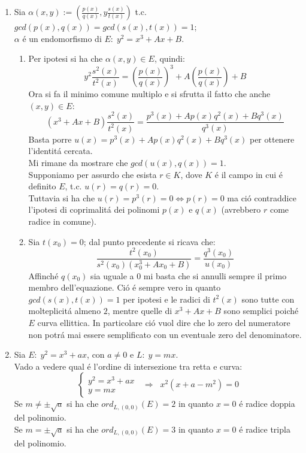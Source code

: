 \documentclass[a4paper]{article}
\newcommand{\sist}{\begin{cases}}
\newcommand{\esist}{\end{cases}}
\newcommand{\ds}{\displaystyle}
\begin{document}
\begin{enumerate}
\begin{enumerate}
\item Se $j(E)=0\;\Rightarrow\;a_2=0$ si ha che il cambiamento di variabile esiste per il punto \textbf{(b)}.\\
Se $j(E)\neq 0\;\Rightarrow\;a_2\neq 0$ e posso sempre supporre $a_4=0$, il cambiamento esiste per il punto 
\textbf{(c)}.  
 

\end{enumerate}




\item Sia $\alpha(x,y):=\ds{\left(\frac{p(x)}{q(x)},y\frac{s(x)}{t(x)}\right)}$ t.c. 
$gcd(p(x),q(x))=gcd(s(x),t(x))=1$;\\
$\alpha$ \'e un endomorfismo di $E:\;y^2=x^3+A x+B$.\\
\begin{enumerate}
\item Per ipotesi si ha che $\alpha(x,y)\in E$, quindi:
$$y^2\ds{\frac{s^2(x)}{t^2(x)}=\left(\frac{p(x)}{q(x)}\right)^3+A\left(\frac{p(x)}{q(x)}\right)+B}$$
Ora si fa il minimo comune multiplo e si sfrutta il fatto che anche $(x,y)\in E$:
$$(x^3+Ax+B)\ds{\frac{s^2(x)}{t^2(x)}=\frac{p^3(x)+A p(x) q^2(x)+ B q^3(x)}{q^3(x)}}$$
Basta porre $u(x)=p^3(x)+A p(x) q^2(x)+ B q^3(x)$ per ottenere l'identit\'a cercata.\\
Mi rimane da mostrare che $gcd(u(x),q(x))=1$.\\
Supponiamo per assurdo che esista $r\in K$, dove $K$ \'e il campo in cui \'e definito $E$, t.c. 
$u(r)=q(r)=0$.\\ 
Tuttavia si ha che $u(r)=p^3(r)=0\Leftrightarrow p(r)=0$ ma ci\'o contraddice l'ipotesi di coprimalit\'a dei polinomi $p(x)$ e $q(x)$ (avrebbero $r$ come radice in comune).
\item Sia $t(x_0)=0$; dal punto precedente si ricava che:
$$\ds{\frac{t^2(x_0)}{s^2(x_0)(x_0^3+Ax_0+B)}=\frac{q^3(x_0)}{u(x_0)}}$$
Affinch\'e $q(x_0)$ sia uguale a $0$ mi basta che si annulli sempre il primo membro dell'equazione. 
Ci\'o \'e sempre vero in quanto $gcd(s(x),t(x))=1$ per ipotesi e le radici di $t^2(x)$ sono tutte con molteplicit\'a almeno $2$, mentre quelle di $x^3+Ax+B$ sono semplici poich\'e $E$ curva ellittica. In particolare ci\'o vuol dire che lo zero del numeratore non potr\'a mai essere semplificato con un eventuale zero del denominatore.\\
\end{enumerate}


\item Sia $E:\;y^2=x^3+ax$, con $a\neq 0$ e $L:\;y=mx$.\\
Vado a vedere qual \'e l'ordine di intersezione tra retta e curva:
$$\sist
y^2=x^3+ax\\
y=mx
\esist\;\;\Rightarrow\;\;x^2(x+a-m^2)=0$$
Se $m\neq \pm\sqrt{a}$ si ha che $ord_{L,(0,0)}(E)=2$ in quanto $x=0$ \'e radice doppia del polinomio.\\
Se $m=\pm\sqrt{a}$ si ha che $ord_{L,(0,0)}(E)=3$ in quanto $x=0$ \'e radice tripla del polinomio.




\end{enumerate}
\end{document}
